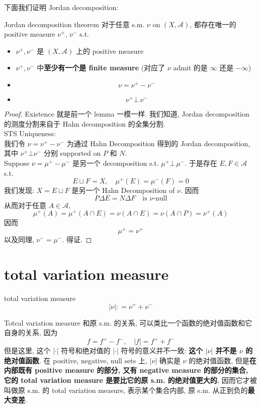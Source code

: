 \documentclass[lang=cn,11pt]{elegantbook}
\begin{document}
下面我们证明 Jordan decomposition: 
\begin{theorem}{Jordan decomposition theorem}
对于任意 s.m. $\nu$ on  $(X,\mathcal{A})$, 都存在唯一的 positive measure $\nu^+$, $\nu^-$ s.t. 
    \begin{itemize}
        \item $\nu^+,\nu^-$ 是 $(X,\mathcal{A})$ 上的 positive measure
        \item $\nu^+,\nu^-$ 中\textbf{至少有一个是 finite measure} (对应了 $\nu$ admit 的是 $\infty$ 还是 $-\infty$)
        \item \[\nu = \nu^+ - \nu^-\]
        \item \[ \nu^+ \bot \,\nu^- \]
    \end{itemize}
\end{theorem}
\begin{proof}
    Existence 就是前一个 lemma 一模一样. 我们知道, Jordan decomposition 的测度分割来自于 Hahn decomposition 的全集分割.\\
    STS Uniqueness:\\
我们令 $    \nu = \nu^+ - \nu^-$ 为通过 Hahn Decomposition 得到的 Jordan decomposition, 其中 $\nu^+\bot \nu^-$ 分别 supported on $P$ 和 $N$.\\
Suppose \(  \nu  = \mu^+ - \mu^-\) 是另一个 decomposition s.t. $ \mu^+ \bot \,  \mu^-$. 于是存在 $E,F \in \mathcal{A}$ s.t. \[
E\sqcup F = X,\quad \mu^+(E) = \mu^-(F) = 0
\]
我们发现: $X = E \sqcup F$ 是另一个 Hahn Decomposition of $\nu$. 因而 \[
P \Delta E = N \Delta F  \quad \text{is } \nu\text{-null}
\]
从而对于任意 $A\in\mathcal{A}$, \[
\mu^+(A) = \mu^+(A\cap E) = \nu(A \cap E) = \nu(A \cap P) = \nu^+(A)
\]
因而 \[
\mu^+ = \nu^+
\]以及同理, $\nu^- = \mu^-$. 得证.
\end{proof}



\section{total variation measure}
\begin{definition}{total variation measure}
    \[
    |\nu| : = \nu^+ + \nu^-
    \]
\end{definition}
Totcal variation measure 和原 s.m. 的关系, 可以类比一个函数的绝对值函数和它自身的关系, 因为 \[
f = f^+ - f^-, \quad |f|  = f^+ + f^-
\]
但是这里, 这个 $|\cdot|$ 符号和绝对值的 $|\cdot|$ 符号的意义并不一致:\textbf{ 这个 $|\nu|$ 并不是 $\nu$ 的绝对值函数}. 在 positive, negative, null sets 上,  $|\nu|$ 确实是 $\nu$ 的绝对值函数, 但是\textbf{在内部既有 positive measure 的部分, 又有 negative measure 的部分的集合, 它的 total variation measure 是要比它的原 s.m. 的绝对值更大的. } 因而它才被叫做原 s.m. 的 total variation measure, 表示某个集合内部, 原 s.m. 从正到负的\textbf{最大变差}.
\end{document}
